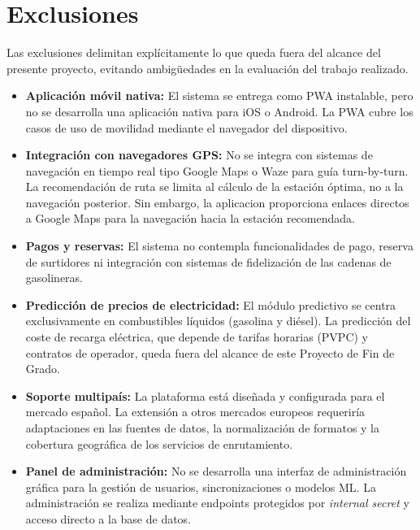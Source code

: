 \section{Exclusiones}

Las exclusiones delimitan explícitamente lo que queda fuera del alcance
del presente proyecto, evitando ambigüedades en la evaluación del
trabajo realizado.

\begin{itemize}
      \item \textbf{Aplicación móvil nativa:} El sistema se entrega como
            PWA instalable, pero no se desarrolla una aplicación nativa para
            iOS o Android. La PWA cubre los casos de uso de movilidad mediante
            el navegador del dispositivo.

      \item \textbf{Integración con navegadores GPS:} No se integra con
            sistemas de navegación en tiempo real tipo Google Maps o Waze para
            guía turn-by-turn. La recomendación de ruta se limita al cálculo
            de la estación óptima, no a la navegación posterior. Sin embargo, la aplicacion proporciona enlaces directos a Google Maps para la navegación hacia la estación recomendada.

      \item \textbf{Pagos y reservas:} El sistema no contempla
            funcionalidades de pago, reserva de surtidores ni integración
            con sistemas de fidelización de las cadenas de gasolineras.

      \item \textbf{Predicción de precios de electricidad:} El módulo
            predictivo se centra exclusivamente en combustibles líquidos
            (gasolina y diésel). La predicción del coste de recarga eléctrica,
            que depende de tarifas horarias (PVPC) y contratos de operador,
            queda fuera del alcance de este Proyecto de Fin de Grado.

      \item \textbf{Soporte multipaís:} La plataforma está diseñada
            y configurada para el mercado español. La extensión a otros mercados
            europeos requeriría adaptaciones en las fuentes de datos,
            la normalización de formatos y la cobertura geográfica de los
            servicios de enrutamiento.

      \item \textbf{Panel de administración:} No se desarrolla una
            interfaz de administración gráfica para la gestión de usuarios,
            sincronizaciones o modelos ML. La administración se realiza
            mediante endpoints protegidos por \textit{internal secret}
            y acceso directo a la base de datos.
\end{itemize}